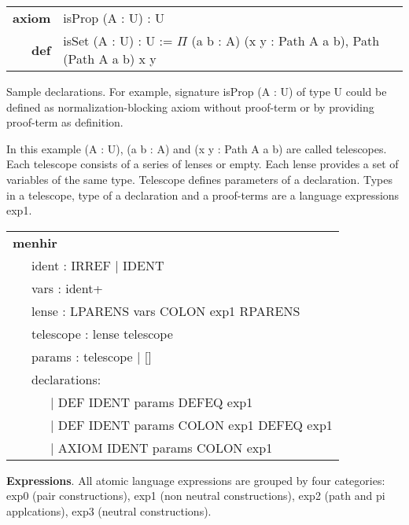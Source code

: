 \documentclass[a4paper,UKenglish,cleveref, autoref, thm-restate]{lipics-v2021}
\begin{document}
\begin{table}[ht!]
\begin{tabular}{rl}
\textbf{axiom} & isProp (A : U) : U \\
\textbf{def} & isSet (A : U) : U := \textbf{$\Pi$} (a b : A) (x y : Path A a b), Path (Path A a b) x y \\
\end{tabular}
\end{table}

Sample declarations. For example, signature isProp (A : U) of type U could be
defined as normalization-blocking axiom without proof-term or by providing proof-term as definition.

In this example (A : U), (a b : A) and (x y : Path A a b) are called telescopes.
Each telescope consists of a series of lenses or empty. Each lense provides a
set of variables of the same type. Telescope defines parameters of a declaration.
Types in a telescope, type of a declaration and a proof-terms are a language expressions exp1.

\begin{table}[ht]
\begin{tabular}{l}
\textbf{menhir} \\
\ \ \ ident : IRREF | IDENT \\
\ \ \ vars : ident+ \\
\ \ \ lense : LPARENS vars COLON exp1 RPARENS \\
\ \ \ telescope : lense telescope \\
\ \ \ params : telescope | [] \\
\ \ \ declarations: \\
\ \ \ \ \ \ | DEF IDENT params DEFEQ exp1 \\
\ \ \ \ \ \ | DEF IDENT params COLON exp1 DEFEQ exp1 \\
\ \ \ \ \ \ | AXIOM IDENT params COLON exp1
\end{tabular}
\end{table}

\textbf{Expressions}. All atomic language expressions are grouped by four categories:
exp0 (pair constructions), exp1 (non neutral constructions), exp2 (path and pi applcations),
exp3 (neutral constructions).
\end{document}
